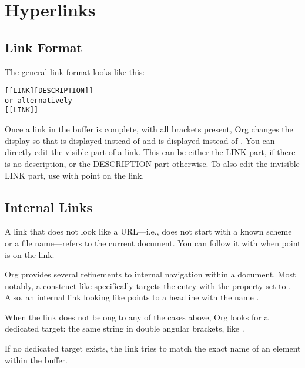 \section{Hyperlinks}
\label{sec:hyperlinks}

\subsection{Link Format}
\label{sec:link-format}


The general link format looks like this:
\begin{tcolorbox}
\begin{verbatim}
[[LINK][DESCRIPTION]]
or alternatively
[[LINK]]
\end{verbatim}
\end{tcolorbox}

Once a link in the buffer is complete, with all brackets present, Org changes the display so that  is displayed instead of \keyword{[[LINK][DESCRIPTION]]} and  is displayed instead of \keyword{[[LINK]]}.
You can directly edit the visible part of a link.
This can be either the LINK part, if there is no description, or the DESCRIPTION part otherwise.
To also edit the invisible LINK part, use  with point on the link.


\subsection{Internal Links}
\label{sec:internal-links}

A link that does not look like a URL—i.e., does not start with a known scheme or a file name—refers to the current document.
You can follow it with  when point is on the link.

Org provides several refinements to internal navigation within a document.
Most notably, a construct like \keyword{\lstinline|[[\#my-custom-id]]|} specifically targets the entry with the  property set to .
Also, an internal link looking like  points to a headline with the name .


When the link does not belong to any of the cases above, Org looks for a dedicated target: the same string in double angular brackets, like .

If no dedicated target exists, the link tries to match the exact name of an element within the buffer.


